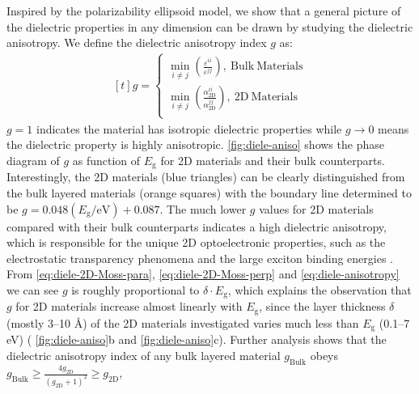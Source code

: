 Inspired by the polarizability ellipsoid model, we show that a general picture of the dielectric properties in
any dimension can be drawn by studying the dielectric
anisotropy. We define the dielectric anisotropy index $g$ as:
\begin{equation}
  \label{eq:diele-anisotropy}
  \begin{aligned}[t]
    g =
    \begin{cases}
      {\displaystyle \min_{i \neq j}}
      {\displaystyle
        \left(\frac{\varepsilon^{ii}}{\varepsilon^{jj}}\right)},
      \ \mathrm{Bulk\ Materials}\\
      {\displaystyle \min_{i \neq j}}
      {\displaystyle
        \left(\frac{\alpha_{\mathrm{2D}}^{ii}}{\alpha_{\mathrm{2D}}^{jj}}\right)},
      \ \mathrm{2D\ Materials}\\
    \end{cases}
  \end{aligned}
\end{equation}
$g=1$ indicates the material has isotropic dielectric properties while
$g \to 0$ means the dielectric property is highly anisotropic.
\autoref{fig:diele-aniso} shows the phase diagram of $g$ as function
of $E_{\mathrm{g}}$ for 2D materials and their bulk
counterparts. Interestingly, the 2D materials (blue triangles) can be
clearly distinguished from the bulk layered materials (orange squares)
with the boundary line determined to be
$g =0.048 (E_{\mathrm{g}}/ \mathrm{eV})+0.087$. The much lower $g$
values for 2D materials compared with their bulk counterparts
indicates a high dielectric anisotropy, which is responsible for the
unique 2D optoelectronic properties, such as the electrostatic
transparency phenomena \cite{Li_2014_screen} and the large exciton binding energies
\cite{Pulci_2014_exciton,Tran_2014_gap_ML_BP,Chernikov_2014_EB_MoS2_2D3D,Berkelbach_2013_exciton}. From
\autoref{eq:diele-2D-Moss-para}, \autoref{eq:diele-2D-Moss-perp} and
\autoref{eq:diele-anisotropy} we can see $g$ is roughly proportional
to $\delta \cdot E_{\mathrm{g}}$, which explains the observation that
$g$ for 2D materials increase almost linearly with $E_{\mathrm{g}}$,
since the layer thickness $\delta$ (mostly 3--10 \AA{}) of the 2D
materials investigated varies much less than $E_{\mathrm{g}}$ (0.1--7
eV) ( \autoref{fig:diele-aniso}b and
\autoref{fig:diele-aniso}c). Further analysis shows that the
dielectric anisotropy index of any bulk layered material
$g_{\mathrm{Bulk}}$ obeys
$g_{\mathrm{Bulk}} \geq {\displaystyle \frac{4
    g_{\mathrm{2D}}}{(g_{\mathrm{2D}}+1)^{2}}} \geq g_{\mathrm{2D}}$,
